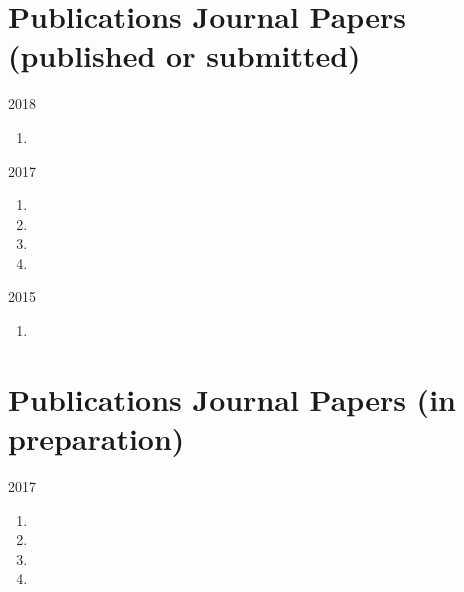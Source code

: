 
\section*{Publications {\small Journal Papers (published or submitted)}}

\begin{paracol}{2}
  \textsc{2018}
\switchcolumn
  \begin{enumerate}
    \item {}
  \end{enumerate}
\end{paracol}

\begin{paracol}{2}
  \textsc{2017}
\switchcolumn
  \begin{enumerate}
    \item {}
    \item {}
    \item {}
    \item {}
    \setcounter{pubcounter}{\theenumi}
  \end{enumerate}
\end{paracol}

\begin{paracol}{2}
  \textsc{2015}
\switchcolumn
  \begin{enumerate}
    \setcounter{enumi}{\thepubcounter}
    \item {}
    \setcounter{pubcounter}{\theenumi}
  \end{enumerate}
\end{paracol}

\section*{Publications {\small Journal Papers (in preparation)}}

\begin{paracol}{2}
  \textsc{2017}
\switchcolumn
    \begin{enumerate}
      \setcounter{enumi}{\thepubcounter}
      \item {}
      \item {}
      \item {}
      \item {}
      \setcounter{pubcounter}{\theenumi}
    \end{enumerate}
\end{paracol}

